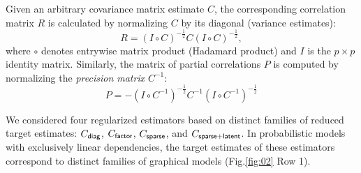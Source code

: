 \documentclass[10pt]{article}
\newcommand{\figref}[2]{Fig.\;\ref{fig:#1}\,#2}
\begin{document}
Given an arbitrary covariance matrix estimate $C$, the corresponding correlation matrix $R$ is calculated by normalizing $C$ by its diagonal (variance estimates):
\begin{equation}\label{eq:precision}
    R = \left(I\circ C\right)^{-\frac 1 2} C \left(I\circ C\right)^{-\frac 1 2},
\end{equation}
where $\circ$ denotes entrywise matrix product (Hadamard product) and $I$ is the $p\times p$ identity matrix. 
Similarly, the matrix of partial correlations $P$ is computed by normalizing the \emph{precision matrix} $C^{-1}$:
\begin{equation}\label{eq:partial}
    P = -\left(I\circ C^{-1}\right)^{-\frac 1 2} C^{-1} \left(I\circ C^{-1}\right)^{-\frac 1 2}
\end{equation}

We considered four regularized estimators based on distinct families of reduced target estimates: $C_{\sf diag}$, $C_{\sf factor}$, $C_{\sf sparse}$, and $C_{\sf sparse+latent}$. In probabilistic models with exclusively linear dependencies, the target estimates of these estimators correspond to distinct families of graphical models (\figref{02}{\,Row 1}).  
\end{document}
